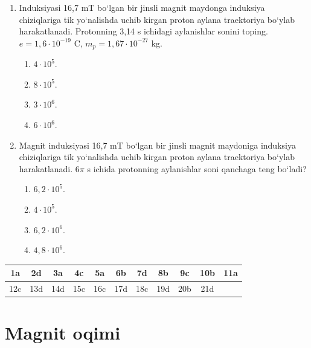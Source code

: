 \begin{enumerate}
\item Induksiyasi 16,7 mT bo‘lgan bir jinsli magnit maydonga induksiya chiziqlariga tik yo‘nalishda uchib kirgan proton aylana traektoriya bo‘ylab harakatlanadi. Protonning 3,14 s ichidagi aylanishlar sonini toping. $e = 1,6 \cdot 10^{-19}$ C, $m_p = 1,67 \cdot 10^{-27}$ kg.
\begin{enumerate}[label=\Alph*)]
\item $4 \cdot 10^5$.
\item $8 \cdot 10^5$.
\item $3 \cdot 10^6$.
\item $6 \cdot 10^6$.
\end{enumerate}

\item Magnit induksiyasi 16,7 mT bo‘lgan bir jinsli magnit maydoniga induksiya chiziqlariga tik yo‘nalishda uchib kirgan proton aylana traektoriya bo‘ylab harakatlanadi. $6\pi$ s ichida protonning aylanishlar soni qanchaga teng bo‘ladi?
\begin{enumerate}[label=\Alph*)]
\item $6,2 \cdot 10^5$.
\item $4 \cdot 10^5$.
\item $6,2 \cdot 10^6$.
\item $4,8 \cdot 10^6$.
\end{enumerate}

\end{enumerate}




\begin{table}[!ht]
\centering
\begin{tabular}{|c|c|c|c|c|c|c|c|c|c|c|}
\hline
1a & 2d & 3a & 4c & 5a & 6b & 7d & 8b & 9c & 10b & 11a \\ \hline
12c & 13d & 14d & 15c & 16c & 17d & 18c & 19d & 20b & 21d & \\ \hline
\end{tabular}
\end{table}












\section{Magnit oqimi}


